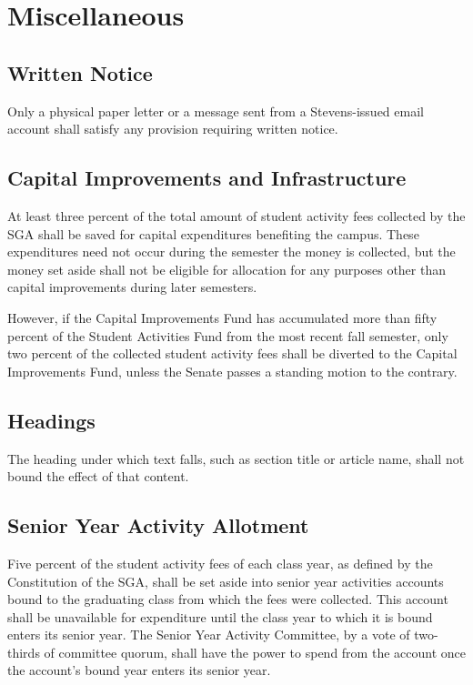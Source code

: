 \documentclass[12pt]{scrreprt}
\begin{document}
\chapter{Miscellaneous}

\section{Written Notice}
Only a physical paper letter or a message sent from a Stevens-issued email account shall satisfy any provision
requiring written notice.

\section{Capital Improvements and Infrastructure}
At least three percent of the total amount of student activity fees collected 
by the SGA shall be saved for capital expenditures benefiting the campus. 
These expenditures need not occur during the semester the money is collected, 
but the money set aside shall not be eligible for allocation for any purposes 
other than capital improvements during later semesters. 

However, if the Capital Improvements Fund has accumulated more than fifty 
percent of the Student Activities Fund from the most recent fall semester, 
only two percent of the collected student activity fees shall be diverted to 
the Capital Improvements Fund, unless the Senate passes a standing motion to 
the contrary. 

\section{Headings}
The heading under which text falls, such as section title or article name, 
shall not bound the effect of that content. 

\section{Senior Year Activity Allotment}
Five percent of the student activity fees of each class year, as defined by 
the Constitution of the SGA, shall be set aside into senior year activities 
accounts bound to the graduating class from which the fees were collected. 
This account shall be unavailable for expenditure until the class year to 
which it is bound enters its senior year. The Senior Year Activity Committee, 
by a vote of two-thirds of committee quorum, shall have the power to spend 
from the account once the account's bound year enters its senior year. 
\end{document}
